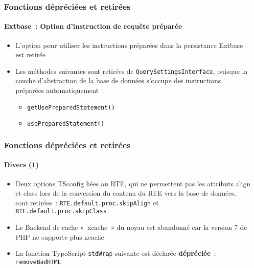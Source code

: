\begin{frame}[fragile]
	\frametitle{Fonctions dépréciées et retirées}
	\framesubtitle{Extbase~: Option d'instruction de requête préparée}

	\begin{itemize}

		\item L'option pour utiliser les instructions préparées dans la persistance Extbase est retirée

		\item Les méthodes suivantes sont retirées de \texttt{QuerySettingsInterface},
			puisque la couche d'abstraction de la base de données s'occupe des instructions préparées automatiquement~:

			\begin{itemize}
				\item \texttt{getUsePreparedStatement()}
				\item \texttt{usePreparedStatement()}
			\end{itemize}

	\end{itemize}

\end{frame}


\begin{frame}[fragile]
	\frametitle{Fonctions dépréciées et retirées}
	\framesubtitle{Divers (1)}

	\begin{itemize}

		\item Deux options TSconfig liées au RTE, qui ne permettent pas les attributs align et class lors de la conversion
			du contenu du RTE vers la base de données, sont retirées~:\newline
			\small
				\texttt{RTE.default.proc.skipAlign} et \texttt{RTE.default.proc.skipClass}
			\normalsize

		\item Le Backend de cache «~xcache~» du noyau est abandonné car la version 7 de PHP ne supporte plus xcache

		\item La fonction TypoScript \texttt{stdWrap} suivante est déclarée \textbf{dépréciée}~:
			\texttt{removeBadHTML}

	\end{itemize}

\end{frame}

